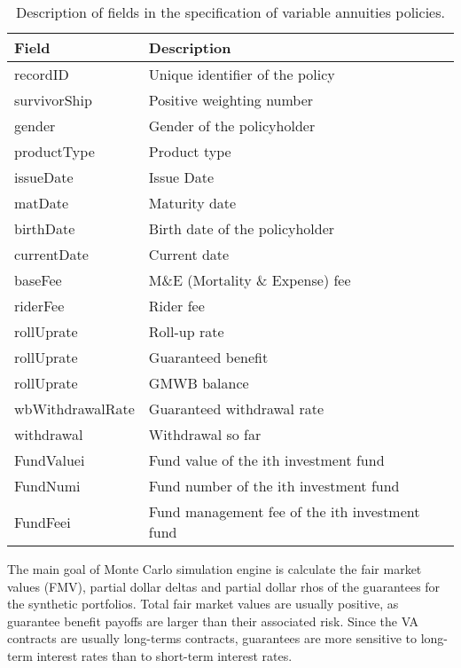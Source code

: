 \begin{table}
\begin{center}
\begin{small}
\begin{tabular}{l l l}
\toprule
Field & Description \\
\midrule
recordID & Unique identifier of the policy \\
survivorShip & Positive weighting number\\
gender & Gender of the policyholder \\
productType & Product type \\
issueDate & Issue Date \\
matDate & Maturity date\\
birthDate & Birth date of the policyholder \\
currentDate & Current date\\
baseFee & M\&E (Mortality \& Expense) fee \\
riderFee & Rider fee \\
rollUprate & Roll-up rate\\
rollUprate & Guaranteed benefit\\
rollUprate & GMWB balance\\
wbWithdrawalRate & Guaranteed withdrawal rate\\
withdrawal & Withdrawal so far\\
FundValuei & Fund value of the ith investment fund\\
FundNumi & Fund number of the ith investment fund\\
FundFeei & Fund management fee of the ith investment fund\\
\bottomrule
\end{tabular}
\end{small}
\end{center}
\caption{Description of fields in the specification of variable annuities policies.}\label{tab:fields}
\end{table}

The main goal of Monte Carlo simulation engine is calculate the fair market values (FMV), partial dollar deltas and partial dollar rhos of the guarantees for the synthetic portfolios. Total fair market values are usually positive, as guarantee benefit payoffs are larger than their associated risk. Since the VA contracts are usually long-terms contracts, guarantees are more sensitive to long-term interest rates than to short-term interest rates. 


